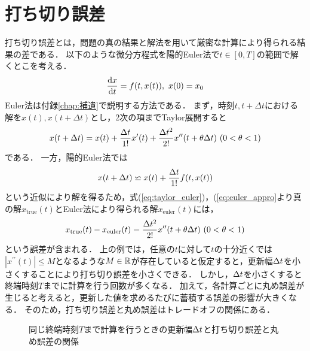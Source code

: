 \section{打ち切り誤差}
打ち切り誤差とは，問題の真の結果と解法を用いて厳密な計算により得られる結果の差である．
以下のような微分方程式を陽的Euler法で$t \in [0,T]$の範囲で解くとこを考える．
\begin{equation}
    \frac{\mathrm{d}x}{\mathrm{d}t} = f(t,x(t)), \ x(0) = x_0
\end{equation}
Euler法は付録\ref{chap:補遺}で説明する方法である．
まず，時刻$t,t+\Delta t$における解を$x(t),x(t+\Delta t)$とし，2次の項までTaylor展開すると
\begin{align}
    \label{eq:taylor_euler}
    x(t + \Delta t) = x(t) + \frac{\Delta t}{1!}x^{\prime}(t) + \frac{\Delta t^2}{2!}x^{\prime\prime}(t + \theta\Delta t) \ (0 < \theta < 1)
\end{align}
である．
一方，陽的Euler法では
\label{eq:euler_appro}
\begin{align}
    x(t + \Delta t) \backsimeq x(t) + \frac{\Delta t}{1!}f(t,x(t))
\end{align}
という近似により解を得るため，式(\ref{eq:taylor_euler})，(\ref{eq:euler_appro}より真の解$x_{\mathrm{true}}(t)$とEuler法により得られる解$x_{\mathrm{euler}}(t)$には，
\begin{align}
    x_{\mathrm{true}}(t) - x_{\mathrm{euler}}(t) = \frac{\Delta t^2}{2!}x^{\prime\prime}(t + \theta\Delta t) \ (0 < \theta < 1)
\end{align}
という誤差が含まれる．
上の例では，任意の$t$に対して$t$の十分近くでは$|x^{\prime\prime}(t)| \leq M$となるような$M \in \mathbb{R}$が存在していると仮定すると，更新幅$\Delta t$を小さくすることにより打ち切り誤差を小さくできる．
しかし，$\Delta t$を小さくすると終端時刻$T$までに計算を行う回数が多くなる．
加えて，各計算ごとに丸め誤差が生じると考えると，更新した値を求めるたびに蓄積する誤差の影響が大きくなる．
そのため，打ち切り誤差と丸め誤差はトレードオフの関係にある．
\begin{figure}[H]
    \centering
    \caption{同じ終端時刻$T$まで計算を行うときの更新幅$\Delta t$と打ち切り誤差と丸め誤差の関係}
    \label{fig:error_tradingoff}
\end{figure}


